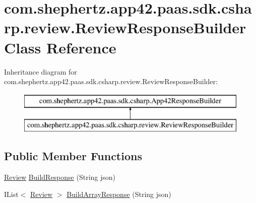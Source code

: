 \hypertarget{classcom_1_1shephertz_1_1app42_1_1paas_1_1sdk_1_1csharp_1_1review_1_1_review_response_builder}{\section{com.\+shephertz.\+app42.\+paas.\+sdk.\+csharp.\+review.\+Review\+Response\+Builder Class Reference}
\label{classcom_1_1shephertz_1_1app42_1_1paas_1_1sdk_1_1csharp_1_1review_1_1_review_response_builder}
}
Inheritance diagram for com.\+shephertz.\+app42.\+paas.\+sdk.\+csharp.\+review.\+Review\+Response\+Builder\+:\begin{figure}[H]
\begin{center}
\leavevmode
\includegraphics[height=2.000000cm]{classcom_1_1shephertz_1_1app42_1_1paas_1_1sdk_1_1csharp_1_1review_1_1_review_response_builder}
\end{center}
\end{figure}
\subsection*{Public Member Functions}
\begin{DoxyCompactItemize}
\item 
\hyperlink{classcom_1_1shephertz_1_1app42_1_1paas_1_1sdk_1_1csharp_1_1review_1_1_review}{Review} \hyperlink{classcom_1_1shephertz_1_1app42_1_1paas_1_1sdk_1_1csharp_1_1review_1_1_review_response_builder_aacae11e755e3682590ba82ff41708370}{Build\+Response} (String json)
\item 
I\+List$<$ \hyperlink{classcom_1_1shephertz_1_1app42_1_1paas_1_1sdk_1_1csharp_1_1review_1_1_review}{Review} $>$ \hyperlink{classcom_1_1shephertz_1_1app42_1_1paas_1_1sdk_1_1csharp_1_1review_1_1_review_response_builder_a127de43c845db79a2633c2407291f093}{Build\+Array\+Response} (String json)
\end{DoxyCompactItemize}


